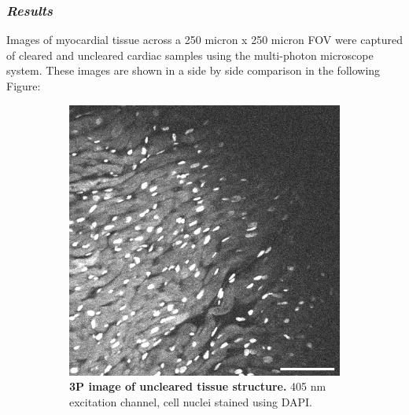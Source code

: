 \subsubsection{\textit{Results}}

Images of myocardial tissue across a 250 micron x 250 micron FOV were captured of cleared and uncleared cardiac samples using the multi-photon microscope system. These images are shown in a side by side comparison in the following Figure:

\begin{figure}[H]
\centering
\begin{subfigure}[t]{0.475\textwidth}
\includegraphics[width=1\linewidth]{Images/Uncleared_Structure.png}
\caption{\textbf{3P image of uncleared tissue structure.} 405 nm excitation channel, cell nuclei stained using DAPI.}
\label{fig:enter-label}
\end{subfigure}
~
\begin{subfigure}[t]{0.475\textwidth}

\end{subfigure}
\end{figure}
